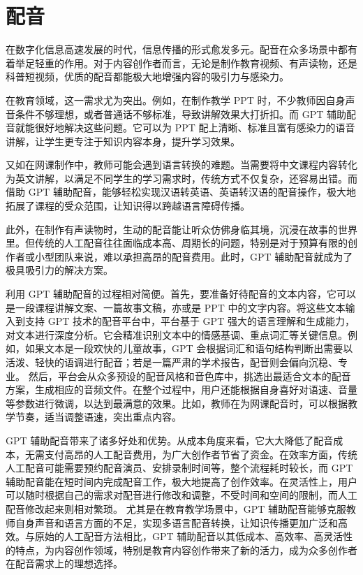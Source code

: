 \section{配音}\label{sec:dubbing}
在数字化信息高速发展的时代，信息传播的形式愈发多元。配音在众多场景中都有着举足轻重的作用。对于内容创作者而言，无论是制作教育视频、有声读物，还是科普短视频，优质的配音都能极大地增强内容的吸引力与感染力。

在教育领域，这一需求尤为突出。例如，在制作教学 PPT 时，不少教师因自身声音条件不够理想，或者普通话不够标准，导致讲解效果大打折扣。而 GPT 辅助配音就能很好地解决这些问题。它可以为 PPT 配上清晰、标准且富有感染力的语音讲解，让学生更专注于知识内容本身，提升学习效果。

又如在网课制作中，教师可能会遇到语言转换的难题。当需要将中文课程内容转化为英文讲解，以满足不同学生的学习需求时，传统方式不仅复杂，还容易出错。而借助 GPT 辅助配音，能够轻松实现汉语转英语、英语转汉语的配音操作，极大地拓展了课程的受众范围，让知识得以跨越语言障碍传播。

此外，在制作有声读物时，生动的配音能让听众仿佛身临其境，沉浸在故事的世界里。但传统的人工配音往往面临成本高、周期长的问题，特别是对于预算有限的创作者或小型团队来说，难以承担高昂的配音费用。此时，GPT 辅助配音就成为了极具吸引力的解决方案。


利用 GPT 辅助配音的过程相对简便。首先，要准备好待配音的文本内容，它可以是一段课程讲解文案、一篇故事文稿，亦或是 PPT 中的文字内容。将这些文本输入到支持 GPT 技术的配音平台中，平台基于 GPT 强大的语言理解和生成能力，对文本进行深度分析。它会精准识别文本中的情感基调、重点词汇等关键信息。例如，如果文本是一段欢快的儿童故事，GPT 会根据词汇和语句结构判断出需要以活泼、轻快的语调进行配音；若是一篇严肃的学术报告，配音则会偏向沉稳、专业。
然后，平台会从众多预设的配音风格和音色库中，挑选出最适合文本的配音方案，生成相应的音频文件。在整个过程中，用户还能根据自身喜好对语速、音量等参数进行微调，以达到最满意的效果。比如，教师在为网课配音时，可以根据教学节奏，适当调整语速，突出重点内容。



GPT 辅助配音带来了诸多好处和优势。从成本角度来看，它大大降低了配音成本，无需支付高昂的人工配音费用，为广大创作者节省了资金。在效率方面，传统人工配音可能需要预约配音演员、安排录制时间等，整个流程耗时较长，而 GPT 辅助配音能在短时间内完成配音工作，极大地提高了创作效率。在灵活性上，用户可以随时根据自己的需求对配音进行修改和调整，不受时间和空间的限制，而人工配音修改起来则相对繁琐。
尤其是在教育教学场景中，GPT 辅助配音能够克服教师自身声音和语言方面的不足，实现多语言配音转换，让知识传播更加广泛和高效。与原始的人工配音方法相比，GPT 辅助配音以其低成本、高效率、高灵活性的特点，为内容创作领域，特别是教育内容创作带来了新的活力，成为众多创作者在配音需求上的理想选择。


